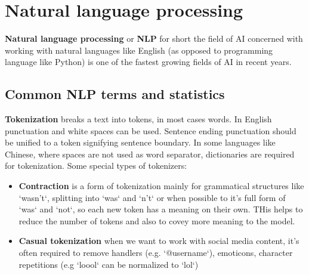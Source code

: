 \chapter{Natural language processing}

\textbf{Natural language processing} or \textbf{NLP} for short the field of AI concerned with working with natural languages like English (as opposed to programming language like Python) is one of the fastest growing fields of AI in recent years.

\section{Common NLP terms and statistics}

\textbf{Tokenization} breaks a text into tokens, in most cases words. In English punctuation and white spaces can be used. Sentence ending punctuation should be unified to a token signifying sentence boundary. In some languages like Chinese, where spaces are not used as word separator, dictionaries are required for tokenization. Some special types of tokenizers:
\begin{itemize}
    \item \textbf{Contraction} is a form of tokenization mainly for grammatical structures like `wasn't`, splitting into `was` and `n't` or when possible to it's full form of `was` and `not`, so each new token has a meaning on their own. THis helps to reduce the number of tokens and also to covey more meaning to the model.
    \item \textbf{Casual tokenization} when we want to work with social media content, it's often required to remove handlers (e.g. `@username`), emoticons, character repetitions (e.g `loool` can be normalized to `lol`)
\end{itemize}

